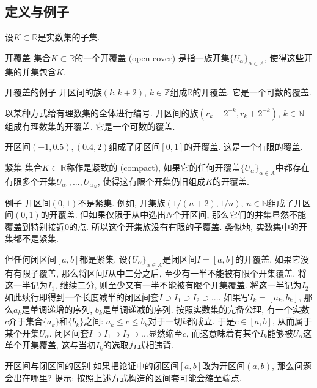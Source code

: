 \subsection{定义与例子}
设$K\subset\mathbb{R}$是实数集的子集.
\begin{definition}{开覆盖}
集合$K\subset\mathbb{R}$的一个开覆盖 (open cover) 是指一族开集$\{U_{\alpha}\}_{\alpha\in A}$, 使得这些开集的并集包含$K$.
\end{definition}

\begin{example}{开覆盖的例子}
开区间的族$(k,k+2),\,k\in\mathbb{Z}$组成$\mathbb{R}$的开覆盖. 它是一个可数的覆盖.

以某种方式给有理数集的全体进行编号. 开区间的族$(r_k-2^{-k},r_k+2^{-k}),\,k\in\mathbb{N}$组成有理数集的开覆盖. 它是一个可数的覆盖.

开区间$(-1,0.5),(0.4,2)$组成了闭区间$[0,1]$的开覆盖. 这是一个有限的覆盖.
\end{example}

\begin{definition}{紧集}
集合$K\subset\mathbb{R}$称作是紧致的 (compact), 如果它的任何开覆盖$\{U_{\alpha}\}_{\alpha\in A}$中都存在有限多个开集$U_{\alpha_1},...,U_{\alpha_N}$, 使得这有限个开集仍旧组成$K$的开覆盖. 
\end{definition}

\begin{example}{例子}
开区间$(0,1)$不是紧集. 例如, 开集族$(1/(n+2),1/n),\,n\in\mathbb{N}$组成了开区间$(0,1)$的开覆盖. 但如果仅限于从中选出$N$个开区间, 那么它们的并集显然不能覆盖到特别接近$0$的点. 所以这个开集族没有有限的子覆盖. 类似地, 实数集中的开集都不是紧集.

但任何闭区间$[a,b]$都是紧集. 设$\{U_\alpha\}_{\alpha\in A}$是闭区间$I=[a,b]$的开覆盖. 如果它没有有限子覆盖, 那么将区间$I$从中二分之后, 至少有一半不能被有限个开集覆盖. 将这一半记为$I_1$, 继续二分, 则至少又有一半不能被有限个开集覆盖. 将这一半记为$I_2$. 如此续行即得到一个长度减半的闭区间套$I\supset I_1\supset I_2\supset...$. 如果写$I_k=[a_k,b_k]$, 那么$a_k$是单调递增的序列, $b_k$是单调递减的序列. 按照实数集的完备公理, 有一个实数$c$介于集合$\{a_k\}$和$\{b_k\}$之间: $a_k\leq c\leq b_k$对于一切$k$都成立. 于是$c\in[a,b]$, 从而属于某个开集$U_\alpha$. 闭区间套$I\supset I_1\supset I_2\supset...$显然缩至$c$, 而这意味着有某个$I_k$能够被$U_\alpha$这单个开集覆盖, 这与当初$I_k$的选取方式相违背.
\end{example}

\begin{exercise}{开区间与闭区间的区别}
如果把论证中的闭区间$[a,b]$改为开区间$(a,b)$, 那么问题会出在哪里? 提示: 按照上述方式构造的区间套可能会缩至端点.
\end{exercise}

